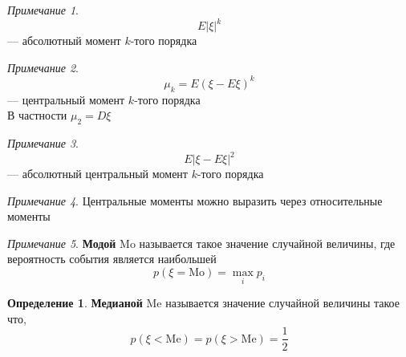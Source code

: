 \documentclass[english]{article}
\theoremstyle{plain}
\theoremstyle{remark}
\newtheorem*{remark}{Примечание}
\theoremstyle{definition}
\newtheorem*{definition}{Определение}
\begin{document}
\begin{enumerate}
\begin{remark}
\[ E|\xi|^k \] --- абсолютный момент \(k\)-того порядка
\end{remark}
\begin{remark}
\[ \mu_k = E(\xi - E\xi)^k \] --- центральный момент \(k\)-того порядка \\
В частности \(\mu_2 = D\xi\)
\end{remark}
\begin{remark}
\[ E|\xi - E\xi|^2 \] --- абсолютный центральный момент \(k\)-того порядка
\end{remark}
\begin{remark}
Центральные моменты можно выразить через относительные моменты
\todo
\end{remark}
\begin{remark}
\textbf{Модой} \(\text{Mo}\) называется такое значение случайной величины, где вероятность события является наибольшей
\[ p(\xi = \text{Mo}) = \max\limits_i p_i \]
\end{remark}
\begin{definition}
\textbf{Медианой} \(\text{Me}\) называется значение случайной величины такое что, \[p(\xi < \text{Me}) = p(\xi > \text{Me}) = \frac{1}{2}\]
\end{definition}
\end{enumerate}
\end{document}
